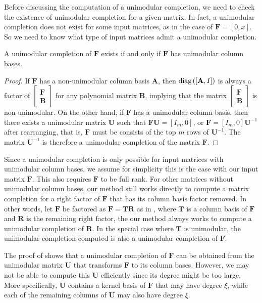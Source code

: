 Before discussing the computation of a unimodular completion, we need
to check the existence of unimodular completion for a given matrix.
In fact, a unimodular completion does not exist for some input matrices,
as in the case of $\mathbf{F}=\left[0,x\right]$. So we need to know
what type of input matrices admit a unimodular completion.
\begin{lem}
\label{lem:unimodularCompletionCondition}A unimodular completion
of $\mathbf{F}$ exists if and only if $\mathbf{F}$ has unimodular
column bases. \end{lem}
\begin{proof}
If $\mathbf{F}$ has a non-unimodular column basis $\mathbf{A}$,
then $\mbox{diag}\left(\left[\mathbf{A},I\right]\right)$ is always a factor
of $\begin{bmatrix}\mathbf{F}\\
\mathbf{B}
\end{bmatrix}$ for any polynomial matrix $\mathbf{B}$, implying that the matrix
$\begin{bmatrix}\mathbf{F}\\
\mathbf{B}
\end{bmatrix}$ is non-unimodular. On the other hand, if $\mathbf{F}$ has a unimodular
column basis, then there exists a unimodular matrix $\mathbf{U}$
such that $\mathbf{F}\mathbf{U}=\left[I_{m},0\right]$, or $\mathbf{F}=\left[I_{m},0\right]\mathbf{U}^{-1}$
after rearranging, that is, $\mathbf{F}$ must be consists of the
top $m$ rows of $\mathbf{U}^{-1}$. The matrix $\mathbf{U}^{-1}$
is therefore a unimodular completion of the matrix $\mathbf{F}$.
\end{proof}
Since a unimodular completion is only possible for input matrices
with unimodular column bases, we assume for simplicity this is the
case with our input matrix $\mathbf{F}$. This also requires $\mathbf{F}$
to be full rank. For other matrices without unimodular column bases,
our method still works directly to compute a matrix completion for
a right factor of $\mathbf{F}$ that has its column basis factor removed.
In other words, let $\mathbf{F}$ be factored as $\mathbf{F}=\mathbf{T}\mathbf{R}$
as in , where $\mathbf{T}$ is a column
basis of $\mathbf{F}$ and $\mathbf{R}$ is the remaining right factor,
the our method always works to compute a unimodular completion of
$\mathbf{R}$. In the special case where $\mathbf{T}$ is unimodular,
the unimodular completion computed is also a unimodular completion
of $\mathbf{F}$.

The proof of  shows
that a unimodular completion of $\mathbf{F}$ can be obtained from
the unimodular matrix $\mathbf{U}$ that transforms $\mathbf{F}$
to its column bases. However, we may not be able to compute this $\mathbf{U}$
efficiently since its degree might be too large. More specifically,
$\mathbf{U}$ contains a kernel basis of $\mathbf{F}$ that may have
degree $\xi$, while each of the remaining columns of $\mathbf{U}$
may also have degree $\xi$. 

